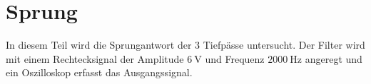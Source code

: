 \section{Sprung}
In diesem Teil wird die Sprungantwort der 3 Tiefpässe untersucht. Der Filter wird mit einem Rechtecksignal der Amplitude $\SI{6}{\volt}$ und Frequenz $\SI{2000}{\hertz}$  angeregt und ein Oszilloskop erfasst das Ausgangssignal.


\begin{figure}[H]
\begin{center}

\end{center}
\end{figure}
